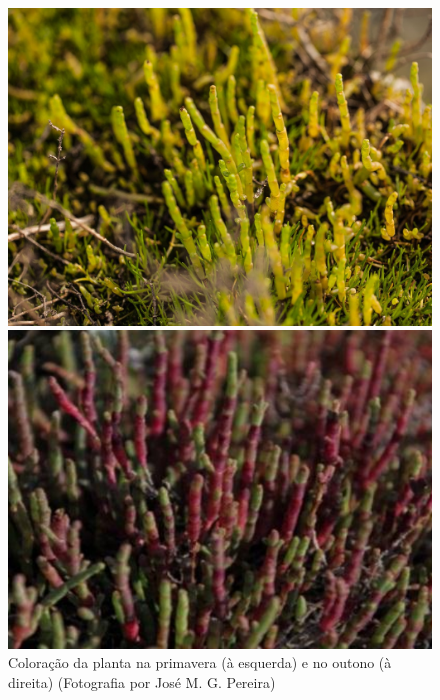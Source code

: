 \begin{figure}[h]
	\centering
	\begin{minipage}[b]{0.49\textwidth}
		\includegraphics[width=\textwidth]{img/cap2-sali/Salicornia04.JPG}
	\end{minipage}
	\hfill
	\begin{minipage}[b]{0.49\textwidth}
		\includegraphics[width=\textwidth]{img/cap2-sali/sal-outono.png}
	\end{minipage}
	\caption{Coloração da planta \sr \space na primavera (à esquerda) e no outono (à direita) (Fotografia por José M. G. Pereira)}
	\label{primoutono}
\end{figure}



